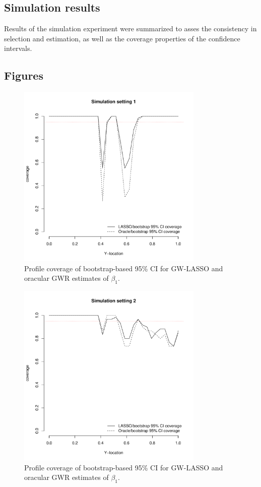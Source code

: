 \documentclass[authoryear, review, 11pt]{elsarticle}
\begin{document}
	\subsection{Simulation results}
	Results of the simulation experiment were summarized to asses the consistency in selection and estimation, as well as the coverage properties of the confidence intervals.
	
	\subsection{Figures}
	\begin{figure}
		\begin{center}
			\includegraphics[height=3.5in]{../../figures/simulation/28-1-profile-coverage.pdf}
			\caption{Profile coverage of bootstrap-based 95\% CI for GW-LASSO and oracular GWR estimates of $\beta_1$.\label{fig:simulation-1-coverage}}
		\end{center}
	\end{figure}

	\begin{figure}
		\begin{center}
			\includegraphics[height=3.5in]{../../figures/simulation/28-2-profile-coverage.pdf}
			\caption{Profile coverage of bootstrap-based 95\% CI for GW-LASSO and oracular GWR estimates of $\beta_1$.\label{fig:simulation-2-coverage}}
		\end{center}
	\end{figure}
	
\end{document}
